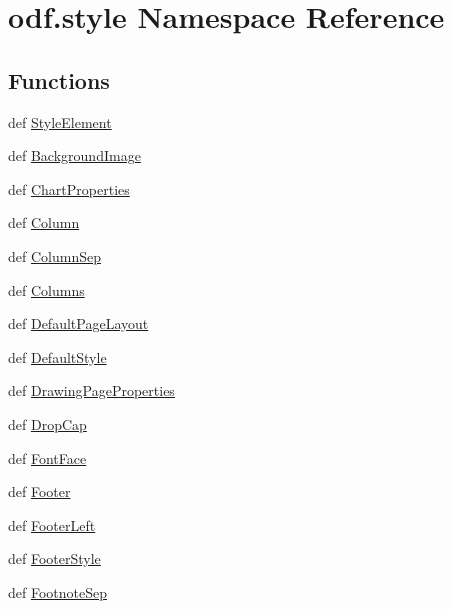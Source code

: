 \hypertarget{namespaceodf_1_1style}{\section{odf.\+style Namespace Reference}
\label{namespaceodf_1_1style}
}
\subsection*{Functions}
\begin{DoxyCompactItemize}
\item 
def \hyperlink{namespaceodf_1_1style_a156e7f478c89af45c4102d1b78639a71}{Style\+Element}
\item 
def \hyperlink{namespaceodf_1_1style_a292afd9ae1d1a4be9119e2ceef7e402f}{Background\+Image}
\item 
def \hyperlink{namespaceodf_1_1style_a9456a51e1eee449c05516e003de566da}{Chart\+Properties}
\item 
def \hyperlink{namespaceodf_1_1style_a7522b61734ca7f42d82fbbac2d51ce72}{Column}
\item 
def \hyperlink{namespaceodf_1_1style_aa57663c3a048cb97739ff0204ed49250}{Column\+Sep}
\item 
def \hyperlink{namespaceodf_1_1style_a246a0b322751c352ed4968e82e928a64}{Columns}
\item 
def \hyperlink{namespaceodf_1_1style_ac3f168af7db9a67f79af3410ea023e25}{Default\+Page\+Layout}
\item 
def \hyperlink{namespaceodf_1_1style_a1b2ad8fc155f439928da97884fc5082b}{Default\+Style}
\item 
def \hyperlink{namespaceodf_1_1style_a65c025b44339b702e81d262f5d0fb0b3}{Drawing\+Page\+Properties}
\item 
def \hyperlink{namespaceodf_1_1style_a10c05a5bc48138dc9ac1603a290fcab3}{Drop\+Cap}
\item 
def \hyperlink{namespaceodf_1_1style_ab954ca81bf9616be9a2a3371ca3fd36e}{Font\+Face}
\item 
def \hyperlink{namespaceodf_1_1style_ad68adcf0f71a180c446592be3bed0dc9}{Footer}
\item 
def \hyperlink{namespaceodf_1_1style_aaabfde26b1bf00d2396e084d4dcfb779}{Footer\+Left}
\item 
def \hyperlink{namespaceodf_1_1style_a1c0fd4590daf168cc4ea79b9b1cfa68f}{Footer\+Style}
\item 
def \hyperlink{namespaceodf_1_1style_a8ee6a8794c31046fd43a16f5740be743}{Footnote\+Sep}
\item 

\end{DoxyCompactItemize}
